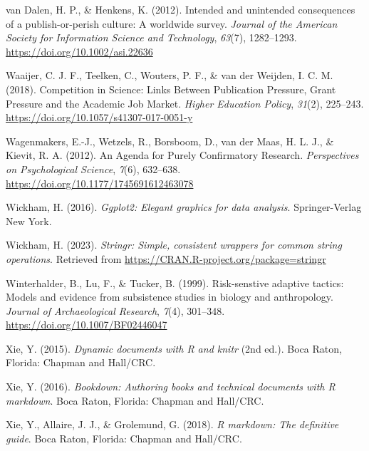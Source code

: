 \documentclass[
  ,man,mask,floatsintext]{apa6}
\newlength{\cslhangindent}
\newlength{\cslentryspacingunit} %
\newenvironment{CSLReferences}[2] %
 {%
  \setlength{\parindent}{0pt}
  \ifodd #1
  \let\oldpar\par
  \def\par{\hangindent=\cslhangindent\oldpar}
  \fi
  \setlength{\parskip}{#2\cslentryspacingunit}
 }%
 {}
\begin{document}
\begin{CSLReferences}{1}{0}
\leavevmode{}%
van Dalen, H. P., \& Henkens, K. (2012). Intended and unintended consequences of a publish-or-perish culture: {A} worldwide survey. \emph{Journal of the American Society for Information Science and Technology}, \emph{63}(7), 1282--1293. \url{https://doi.org/10.1002/asi.22636}

\leavevmode{}%
Waaijer, C. J. F., Teelken, C., Wouters, P. F., \& van der Weijden, I. C. M. (2018). Competition in {Science}: {Links Between Publication Pressure}, {Grant Pressure} and the {Academic Job Market}. \emph{Higher Education Policy}, \emph{31}(2), 225--243. \url{https://doi.org/10.1057/s41307-017-0051-y}

\leavevmode{}%
Wagenmakers, E.-J., Wetzels, R., Borsboom, D., van der Maas, H. L. J., \& Kievit, R. A. (2012). An {Agenda} for {Purely Confirmatory Research}. \emph{Perspectives on Psychological Science}, \emph{7}(6), 632--638. \url{https://doi.org/10.1177/1745691612463078}

\leavevmode{}%
Wickham, H. (2016). \emph{Ggplot2: {Elegant} graphics for data analysis}. Springer-Verlag New York.

\leavevmode{}%
Wickham, H. (2023). \emph{Stringr: Simple, consistent wrappers for common string operations}. Retrieved from \url{https://CRAN.R-project.org/package=stringr}

\leavevmode{}%
Winterhalder, B., Lu, F., \& Tucker, B. (1999). Risk-senstive adaptive tactics: {Models} and evidence from subsistence studies in biology and anthropology. \emph{Journal of Archaeological Research}, \emph{7}(4), 301--348. \url{https://doi.org/10.1007/BF02446047}

\leavevmode{}%
Xie, Y. (2015). \emph{Dynamic documents with {R} and knitr} (2nd ed.). Boca Raton, Florida: {Chapman and Hall/CRC}.

\leavevmode{}%
Xie, Y. (2016). \emph{Bookdown: {Authoring} books and technical documents with {R} markdown}. Boca Raton, Florida: {Chapman and Hall/CRC}.

\leavevmode{}%
Xie, Y., Allaire, J. J., \& Grolemund, G. (2018). \emph{R markdown: {The} definitive guide}. Boca Raton, Florida: {Chapman and Hall/CRC}.

\end{CSLReferences}
\end{document}
